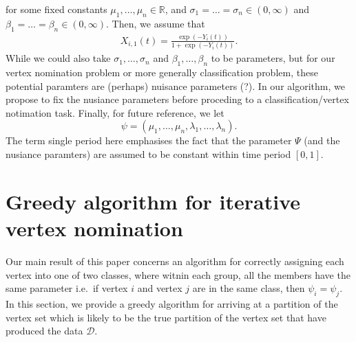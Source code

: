 \documentclass[12pt]{article}%
\begin{document}
for some fixed constants $\mu_1,\ldots, \mu_n \in \mathbb R$, and $\sigma_1 = \ldots = \sigma_n \in (0,\infty)$ and $\beta_1 = \ldots = \beta_n \in (0,\infty)$. 
Then, we assume that 
\begin{eqnarray}
X_{i,1}(t) = \frac{\exp(-Y_i(t))}{1+\exp(-Y_i(t))}.
\end{eqnarray}
While we could also take $\sigma_1,\ldots,\sigma_n$ and $\beta_1,\ldots, \beta_n$ to be parameters, 
but for our vertex nomination problem or more generally classification problem, 
these potential paramters are (perhaps) nuisance parameters (?).  
In our algorithm, we propose to fix the nusiance parameters before proceding to a classification/vertex notimation task.
Finally, for future reference, we let
$$
\psi = (\mu_1,\ldots, \mu_n,\lambda_1,\ldots,\lambda_n).
$$
The term single period here emphasises the fact that the parameter $\Psi$ (and the nusiance paramters) are assumed to be constant within time period $[0,1]$. 
\section{Greedy algorithm for iterative vertex nomination}
 
Our main result of this paper concerns an algorithm 
for correctly assigning each vertex into one of two classes, where witnin each group, all the members  
have the same parameter i.e.\ if vertex $i$ and vertex $j$ are in the same
class, then $\psi_i = \psi_j$.  
In this section, we provide a greedy algorithm for arriving at a partition 
of the vertex set which is likely to be the true partition of 
the vertex set that  have produced the data $\mathcal D$.
\end{document}
